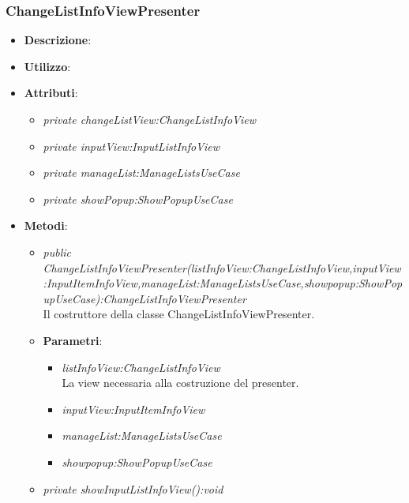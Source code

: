 \subsubsection{ChangeListInfoViewPresenter}
\begin{itemize}
\item \textbf{Descrizione}: 
\item \textbf{Utilizzo}:
\item \textbf{Attributi}:
	\begin{itemize}
	\item \textit{private changeListView:ChangeListInfoView}\\
	
	\item \textit{private inputView:InputListInfoView}\\
	
	\item \textit{private manageList:ManageListsUseCase}\\
	
	\item \textit{private showPopup:ShowPopupUseCase}\\
	
	\end{itemize} 
\item \textbf{Metodi}:
	\begin{itemize}
	\item \textit{public ChangeListInfoViewPresenter(listInfoView:ChangeListInfoView,inputView:InputItemInfoView,manageList:ManageListsUseCase,showpopup:ShowPopupUseCase):ChangeListInfoViewPresenter}\\
Il costruttore della classe ChangeListInfoViewPresenter.
			\item{\textbf{Parametri}: \begin{itemize}
			\item \textit{listInfoView:ChangeListInfoView}\\
			La view necessaria alla costruzione del presenter.
			\item \textit{inputView:InputItemInfoView}\\

			\item \textit{manageList:ManageListsUseCase}\\

			\item \textit{showpopup:ShowPopupUseCase}\\

			\end{itemize}}
	\item \textit{private showInputListInfoView():void}\\


\end{itemize}
\end{itemize}
